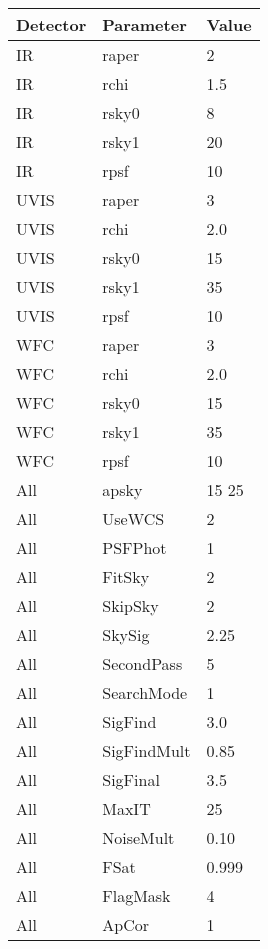 \begin{tabular}{lll}
\toprule
Detector &        Parameter &  Value \\
\midrule
      IR &            raper &      2 \\
      IR &             rchi &    1.5 \\
      IR &            rsky0 &      8 \\
      IR &            rsky1 &     20 \\
      IR &             rpsf &     10 \\
    UVIS &            raper &      3 \\
    UVIS &             rchi &    2.0 \\
    UVIS &            rsky0 &     15 \\
    UVIS &            rsky1 &     35 \\
    UVIS &             rpsf &     10 \\
     WFC &            raper &      3 \\
     WFC &             rchi &    2.0 \\
     WFC &            rsky0 &     15 \\
     WFC &            rsky1 &     35 \\
     WFC &             rpsf &     10 \\
     All &            apsky &  15 25 \\
     All &           UseWCS &      2 \\
     All &          PSFPhot &      1 \\
     All &           FitSky &      2 \\
     All &          SkipSky &      2 \\
     All &           SkySig &   2.25 \\
     All &       SecondPass &      5 \\
     All &       SearchMode &      1 \\
     All &          SigFind &    3.0 \\
     All &      SigFindMult &   0.85 \\
     All &         SigFinal &    3.5 \\
     All &            MaxIT &     25 \\
     All &        NoiseMult &   0.10 \\
     All &             FSat &  0.999 \\
     All &         FlagMask &      4 \\
     All &            ApCor &      1 \\

\end{tabular}
